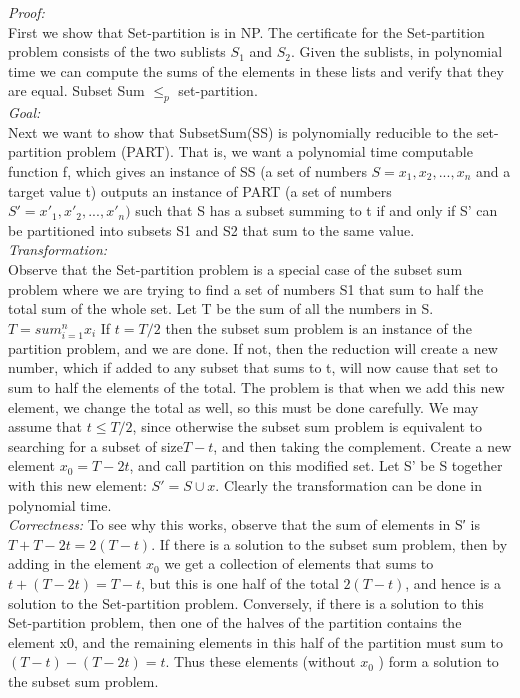 \documentclass[11pt]{article}
\begin{document}
\begin{CJK}{UTF8}{gkai}
\emph{Proof:}\\
First we show that Set-partition is in NP. The certificate for the Set-partition
problem consists of the two sublists $S_1$ and $S_2$. Given the sublists, in polynomial time we
can compute the sums of the elements in these lists and verify that they are equal. Subset
Sum $\leq_p$ set-partition.\\
\emph{Goal:}\\

Next we want to show that SubsetSum(SS) is polynomially reducible to the set-partition
problem (PART). That is, we want a polynomial time computable function f, which gives
an instance of SS (a set of numbers $S = {x_1, x_2, . . . , x_{n}}$ and a target value t) outputs an
instance of PART (a set of numbers $S′ = {x'_1, x'_2 , . . ., x'_{n} })$ such that S has a subset summing
to t if and only if S' can be partitioned into subsets S1 and S2 that sum to the same value.\\

\emph{Transformation:}\\ Observe that the Set-partition problem is a special case of the subset sum
problem where we are trying to find a set of numbers S1 that sum to half the total sum of the
whole set. Let T be the sum of all the numbers in S.
$T=sum_{i=1}^n x_i$
If $t = T/2$ then the subset sum problem is an instance of the partition problem, and we are
done. If not, then the reduction will create a new number, which if added to any subset that
sums to t, will now cause that set to sum to half the elements of the total. The problem is that
when we add this new element, we change the total as well, so this must be done carefully.
We may assume that $t\leq T/2$, since otherwise the subset sum problem is equivalent to
searching for a subset of size$T-t$, and then taking the complement. Create a new element
$x_0 = T-2t$, and call partition on this modified set. Let S' be S together with this new
element: $S' = S\cup{x}$. Clearly the transformation can be done in polynomial time.\\
\emph{Correctness:} To see why this works, observe that the sum of elements in S′ is $T+T-2t =
2(T-t)$. If there is a solution to the subset sum problem, then by adding in the element
$x_0$ we get a collection of elements that sums to $t+(T-2t) = T-t$, but this is one half
of the total $2(T-t)$, and hence is a solution to the Set-partition problem. Conversely,
if there is a solution to this Set-partition problem, then one of the halves of the partition
contains the element x0, and the remaining elements in this half of the partition must sum to
$(T-t)-(T-2t)=t$. Thus these elements (without $x_0$ ) form a solution to the subset sum
problem.



\end{CJK}
\end{document}
